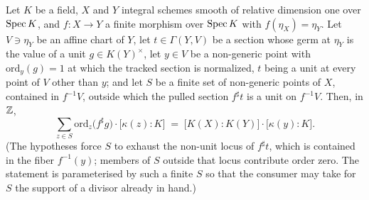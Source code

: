 \begin{theorem}
  \label{pa-thm:sum_ordZ_residueDeg_of_isFinite}
  \leanok

  Let \(K\) be a field, \(X\) and \(Y\) integral schemes smooth of relative dimension
  one over \(\operatorname{Spec} K\), and \(f : X \to Y\) a finite morphism over \(\operatorname{Spec} K\) with
  \(f(\eta_X) = \eta_Y\). Let \(V \ni \eta_Y\) be an affine chart of \(Y\), let
  \(t \in \Gamma(Y, V)\) be a section whose germ at \(\eta_Y\) is the value of a unit
  \(g \in K(Y)^{\times}\), let \(y \in V\) be a non-generic point with
  \(\mathrm{ord}_y(g) = 1\) at which the tracked section is normalized, \(t\) being a
  unit at every point of \(V\) other than \(y\); and let \(S\) be a finite set of
  non-generic points of \(X\), contained in \(f^{-1}V\), outside which the pulled
  section \(f^{\sharp}t\) is a unit on \(f^{-1}V\). Then, in \(\mathbb{Z}\),
  \[
    \sum_{z \in S} \mathrm{ord}_z\bigl(f^{\sharp}g\bigr)
      \cdot \bigl[\kappa(z) : K\bigr]
    \;=\; \bigl[K(X) : K(Y)\bigr] \cdot \bigl[\kappa(y) : K\bigr].
  \]
  (The hypotheses force \(S\) to exhaust the non-unit locus of \(f^{\sharp}t\), which
  is contained in the fiber \(f^{-1}(y)\); members of \(S\) outside that locus
  contribute order zero. The statement is parameterised by such a finite \(S\) so that
  the consumer may take for \(S\) the support of a divisor already in hand.)
\end{theorem}
